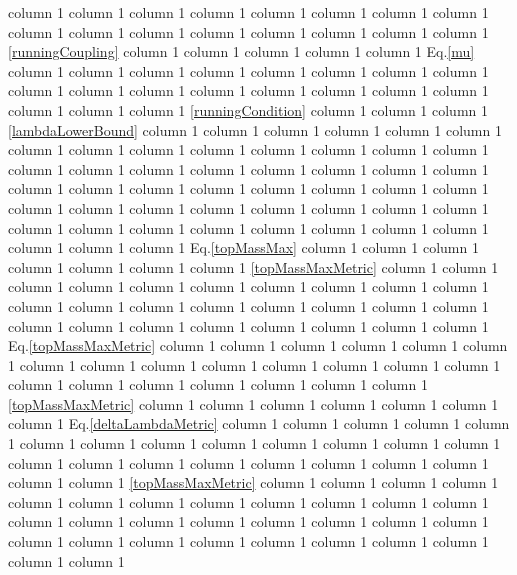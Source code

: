 \documentclass[a4paper,11pt]{article}
\makeatletter
\newcommand*{\Eq}{Eq.\@\xspace}
\makeatother
\begin{document}
  column 1  column 1  column 1  column 1  column 1   column 1  column 1   column 1  column 1   column 1  column 1  column 1  column 1  column 1  column 1  column 1  \eqref{runningCoupling}  column 1  column 1  column 1   column 1  column 1 \Eq \eqref{mu}  column 1  column 1  column 1  column 1   column 1  column 1  column 1  column 1  column 1   column 1     column 1  column 1  column 1  column 1  column 1   column 1  column 1  column 1  column 1 \eqref{runningCondition}  column 1  column 1  column 1 \eqref{lambdaLowerBound}  column 1  column 1  column 1  column 1  column 1  column 1  column 1    column 1  column 1  column 1  column 1  column 1   column 1  column 1   column 1   column 1   column 1  column 1  column 1   column 1  column 1  column 1  column 1   column 1  column 1  column 1  column 1  column 1  column 1  column 1  
  column 1  column 1  column 1   column 1   column 1  column 1  column 1  column 1  column 1  column 1  column 1  column 1  column 1  column 1  column 1  column 1    column 1  column 1  column 1 \Eq \eqref{topMassMax}  column 1  column 1   column 1  column 1  column 1  column 1  column 1 \eqref{topMassMaxMetric}  column 1  column 1  column 1   column 1   column 1   column 1  column 1  column 1  column 1  column 1  column 1  column 1  column 1  column 1  column 1  column 1  column 1  column 1  column 1  column 1  column 1  column 1  column 1  column 1  column 1  column 1 \Eq \eqref{topMassMaxMetric}  column 1  column 1  column 1  column 1  column 1  column 1     column 1  column 1  column 1  column 1  column 1  column 1  column 1  column 1  column 1  column 1  column 1  column 1   column 1  column 1  column 1 \eqref{topMassMaxMetric}  column 1  column 1   column 1  column 1  column 1   column 1  column 1 \Eq \eqref{deltaLambdaMetric}  column 1  column 1   column 1  column 1  column 1  column 1  column 1 \cite{1008.5157, 1403.6078, 1412.3811}  column 1  column 1  column 1  column 1  column 1  column 1  column 1  column 1  column 1  column 1  column 1  column 1  column 1  column 1  column 1  column 1 \eqref{topMassMaxMetric}  column 1  column 1  column 1  column 1  column 1  column 1  column 1  column 1  column 1  column 1  column 1  column 1  column 1   column 1  column 1  column 1  column 1  column 1  column 1  column 1  column 1  column 1  column 1  column 1  column 1  column 1  column 1  column 1  column 1  column 1   
\end{document}
